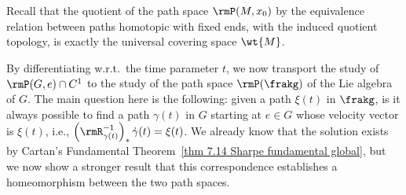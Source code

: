 Recall that the quotient of the path space $\rmP(M,x_0)$ by the equivalence relation between paths homotopic with fixed ends, with the induced quotient topology, is exactly the universal covering space $\wt{M}$.


By differentiating w.r.t.\ the time parameter $t$, we now transport the study of $\rmP(G,e)\cap C^1$ to the study of the path space $\rmP(\frakg)$ of the Lie algebra of $G$. The main question here is the following: given a path $\xi(t)$ in $\frakg$, is it always possible to find a path $\gamma(t)$ in $G$ starting at $e\in G$ whose velocity vector is $\xi(t)$, i.e., $\left(\rmR_{\gamma(t)}^{-1}\right)_{\ast}\dot\gamma(t)=\xi(t)$. We already know that the solution exists by Cartan's Fundamental Theorem~\ref{thm 7.14 Sharpe fundamental global}, but we now show a stronger result that this correspondence establishes a homeomorphism between the two path spaces.

